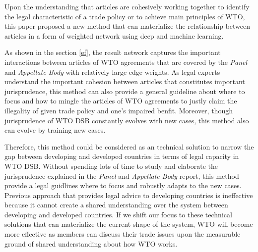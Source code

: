 Upon the understanding that articles are cohesively working together to 
identify the legal characteristic of a trade policy or to achieve main principles of WTO, 
this paper proposed a new method that can materialize the relationship between articles 
in a form of weighted network using deep and machine learning. 

As shown in the section \ref{ef}, the result network captures the important interactions 
between articles of WTO agreements that are covered by the \textit{Panel} and \textit{Appellate Body} with relatively large edge weights.
As legal experts understand the important cohesion between articles that constitutes important jurisprudence,
this method can also provide a general guideline about where to focus and how to mingle the articles of WTO agreements to justly claim 
the illegality of given trade policy and one's impaired benfit. Moreover, though jurisprudence of WTO DSB constantly 
evolves with new cases, this method also can evolve by training new cases.

Therefore, this method could be considered as an technical solution to narrow the gap between developing and developed countries in terms of legal capacity in WTO DSB.
Without spending lots of time to study and elaborate the jurisprudence explained in the \textit{Panel} and \textit{Appellate Body} report, this method provide a legal guidlines where to focus and robustly adapts to the new cases.
Previous approach that provides legal advice to developing countries is ineffective because it cannot create a shared understanding over the system between developing and developed countries.
If we shift our focus to these technical solutions that can materialize the current shape of the system, WTO
will become more effective as members can discuss their trade issues upon the measurable ground of shared understanding about how WTO works.









